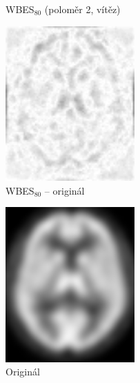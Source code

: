 \begin{figure}[h!]
\begin{minipage}[l]{0.5\textwidth}
            \caption{WBES$_{80}$ (poloměr 2, vítěz)}
        \end{minipage}
        \begin{minipage}[r]{0.5\textwidth}
            \center
            \includegraphics[width = 140pt]{src/8Appendix/final/15-50wbesLD.png}
            \caption{WBES$_{80}$ -- originál}
        \end{minipage}
    \end{figure}
    \newpage
    \begin{figure}[Htp]
        \center
        \begin{minipage}[c]{0.5\textwidth}
            \center
            \includegraphics[width = 140pt]{src/8Appendix/final/original.png}
            \caption{Originál}
        \end{minipage}
    \end{figure}
